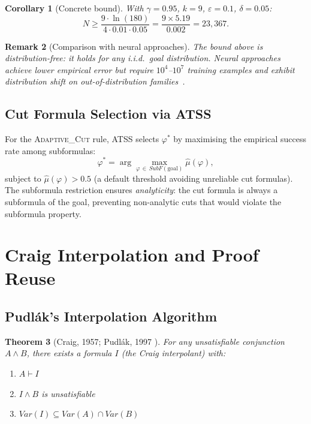 \documentclass[conference]{IEEEtran}
\newtheorem{theorem}{Theorem}[section]
\newtheorem{corollary}[theorem]{Corollary}
\newtheorem{remark}[theorem]{Remark}
\newcommand{\proves}{\vdash}
\newcommand{\ATSS}{\textsc{ATSS}}
\begin{document}
\begin{corollary}[Concrete bound]
  With $\gamma=0.95$, $k=9$, $\varepsilon=0.1$, $\delta=0.05$:
  \[
    N \geq \frac{9 \cdot \ln(180)}{4 \cdot 0.01 \cdot 0.05}
    = \frac{9 \times 5.19}{0.002} = 23{,}367.
  \]
\end{corollary}

\begin{remark}[Comparison with neural approaches]
  The bound above is \emph{distribution-free}: it holds for any
  i.i.d.\ goal distribution.  Neural approaches achieve lower empirical
  error but require $10^4$--$10^7$ training examples and exhibit
  distribution shift on out-of-distribution
  families~\cite{DeepSeekProver2024}.
\end{remark}

\subsection{Cut Formula Selection via ATSS}

For the \textsc{Adaptive\_Cut} rule, \ATSS{} selects $\varphi^*$
by maximising the empirical success rate among subformulas:
\begin{equation}
  \varphi^* = \arg\max_{\varphi \,\in\,
    \mathit{SubF}(\text{goal})}
    \hat{\mu}(\varphi),
\end{equation}
subject to $\hat{\mu}(\varphi) > 0.5$ (a default threshold
avoiding unreliable cut formulas).  The subformula restriction
ensures \emph{analyticity}: the cut formula is always a
subformula of the goal, preventing non-analytic cuts that would
violate the subformula property.

\section{Craig Interpolation and Proof Reuse}
\label{sec:interpolation}

\subsection{Pudl\'{a}k's Interpolation Algorithm}

\begin{theorem}[Craig, 1957; Pudl\'{a}k, 1997 \cite{Krajicek1995}]
  For any unsatisfiable conjunction $A \wedge B$, there exists a
  formula $I$ (the \emph{Craig interpolant}) with:
  \begin{enumerate}
    \item[(i)]   $A \proves I$
    \item[(ii)]  $I \wedge B$ is unsatisfiable
    \item[(iii)] $\mathit{Var}(I) \subseteq
      \mathit{Var}(A) \cap \mathit{Var}(B)$
  \end{enumerate}
\end{theorem}
\end{document}
